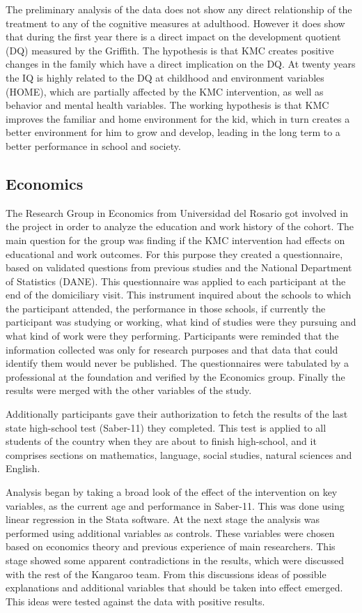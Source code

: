 The preliminary analysis of the data does not show any direct relationship of the treatment to any of the cognitive measures at adulthood. However it does show that during the first year there is a direct impact on the development quotient (DQ) measured by the Griffith. The hypothesis is that KMC creates positive changes in the family which have a direct implication on the DQ. At twenty years the IQ is highly related to the DQ at childhood and  environment variables (HOME), which are partially affected by the KMC intervention, as well as behavior and mental health variables. The working hypothesis is that KMC improves the familiar and home environment for the kid, which in turn creates a better environment for him to grow and develop, leading in the long term to a better performance in school and society.
\subsection{Economics}

The Research Group in Economics from Universidad del Rosario got involved in the project in order to analyze the education and work history of the cohort. The main question for the group was finding if the KMC intervention had effects on educational and work outcomes.  For this purpose they created a questionnaire, based on validated questions from previous studies and the National Department of Statistics (DANE). This questionnaire was applied to each participant at the end of the domiciliary visit. This instrument inquired about the schools to which the participant attended, the performance in those schools, if currently the participant was studying or working, what kind of studies were they pursuing and what kind of work were they performing. Participants were reminded that the information collected was only for research purposes and that data that could identify them would never be published. The questionnaires were tabulated by a professional at the foundation and verified by the Economics group. Finally the results were merged with the other variables of the study.

Additionally participants gave their authorization to fetch the results of the last state high-school test (Saber-11) they completed. This test is applied to all students of the country when they are about to finish high-school, and it comprises sections on mathematics, language, social studies, natural sciences and English.

Analysis began by taking a broad look of the effect of the intervention on key variables, as the current age and performance in Saber-11. This was done using linear regression in the Stata software. At the next stage the analysis was performed using additional variables as controls. These variables were chosen based on economics theory and previous experience of main researchers. This stage showed some apparent contradictions in the results, which were discussed with the rest of the Kangaroo team. From this discussions ideas of possible explanations and additional variables that should be taken into effect emerged. This ideas were tested against the data with positive results. 

